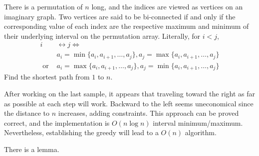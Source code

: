 \documentclass[../../main]{subfiles}
\begin{document}

There is a permutation of $n$ long, and the indices are viewed as vertices on 
an imaginary graph. Two vertices are said to be bi-connected if and only if the
corresponding value of each index are the respective maximum and minimum of their 
underlying interval on the permutation array. Literally, for $i < j$, 
\begin{align*}
    i &\leftrightarrow j \iff \\
    &a_i = \min\{a_i, a_{i+1}, \ldots, a_j\}, a_j = \max\{a_i, a_{i+1}, \ldots, a_j\} \\
    \text{ or } &a_i = \max\{a_i, a_{i+1}, \ldots, a_j\}, a_j = \min\{a_i, a_{i+1}, \ldots, a_j\}
\end{align*}
Find the shortest path from $1$ to $n$.


After working on the last sample, it appears that traveling toward the right 
as far as possible at each step will work. Backward to the left seems uneconomical 
since the distance to $n$ increases, adding constraints. This approach can be proved correct, 
and the implementation is $O(n\log n)$ interval minimum/maximum. 
Nevertheless, establishing the greedy will lead to a $O(n)$ algorithm. 

There is a lemma.
\end{document}
